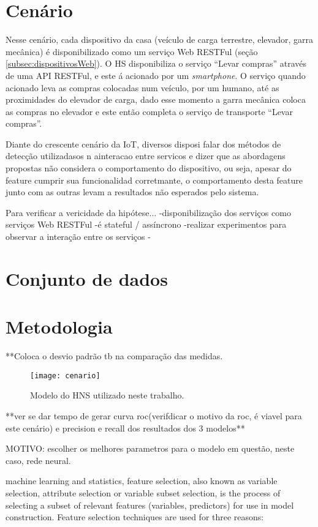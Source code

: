 \section{Cenário}
\label{sec:cenario}
Nesse cenário, cada dispositivo da casa (veículo de carga terrestre, elevador, garra mecânica) é disponibilizado como um serviço Web RESTFul (seção \ref{subsec:dispositivosWeb}). O HS disponibiliza o serviço ``Levar compras'' através de uma API RESTFul, e este á acionado por um \textit{smartphone}. O serviço quando acionado leva as compras colocadas num veículo, por um humano, até as proximidades do elevador de carga, dado esse momento a garra mecânica coloca as compras no elevador e este então completa o serviço de transporte ``Levar compras''.


Diante do crescente cenário da IoT, diversos disposi
falar dos métodos de detecção utilizadasos n ainteracao entre servicos e dizer que as abordagens propostas não considera o comportamento do dispositivo, ou seja, apesar do feature cumprir sua funcionalidad corretmante, o comportamento desta feature junto com as outras levam a resultados não esperados pelo sistema.

Para verificar a vericidade da hipótese...
-disponibilização dos serviços como serviços Web RESTFul
-é stateful / assíncrono
-realizar experimentos para observar a interação entre os serviços
-
\section{Conjunto de dados}
\label{sec:dataset}
\section{Metodologia}
**Coloca o desvio padrão tb na comparação das medidas.
\begin{figure}[!htb] \centering 
  \centering
  \texttt{[image: cenario]} 
  \caption{Modelo do HNS utilizado neste trabalho.} 
  \label{fig:hnsworkmodel}
\end{figure}


**ver se dar tempo de gerar curva roc(verifdicar o motivo da roc, é viavel para este cenário) e precision e recall dos resultados dos 3 modelos**

MOTIVO:
escolher os melhores parametros para o modelo em questão, neste caso, rede neural.

 machine learning and statistics, feature selection, also known as variable selection, attribute selection or variable subset selection, is the process of selecting a subset of relevant features (variables, predictors) for use in model construction. Feature selection techniques are used for three reasons:

